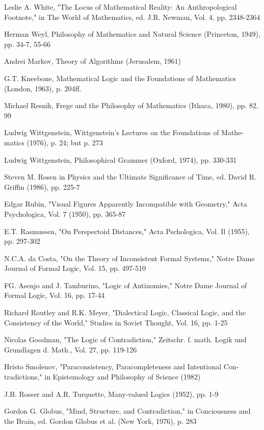 Leslie A. White, "The Locus of Mathematical Reality: An Anthropological 
Footnote," in The World of Mathematics, ed. J.R. Newman, Vol. 4, pp. 
2348-2364 

Herman Weyl, Philosophy of Mathematics and Natural Science (Princeton, 
1949), pp. 34-7, 55-66 

Andrei Markov, Theory of Algorithms (Jerusalem, 1961) 

G.T. Kneebone, Mathematical Logic and the Foundations of Mathematics 
(London, 1963), p. 204ff. 

Michael Resnik, Frege and the Philosophy of Mathematics (Ithaca, 1980), pp. 
82, 99 

Ludwig Wittgenstein, Wittgenstein's Lectures on the Foundations of Mathe- 
matics (1976), p. 24; but p. 273 

Ludwig Wittgenstein, Philosophical Grammer (Oxford, 1974), pp. 330-331 

Steven M. Rosen in Physics and the Ultimate Significance of Time, ed. David 
R. Griffin (1986), pp. 225-7 

Edgar Rubin, "Visual Figures Apparently Incompatible with Geometry," 
Acta Psychologica, Vol. 7 (1950), pp. 365-87 

E.T. Rasmussen, "On Perspectoid Distances," Acta Pschologica, Vol. Il 
(1955), pp. 297-302 

N.C.A. da Costa, "On the Theory of Inconsistent Formal Systems," Notre 
Dame Journal of Formal Logic, Vol. 15, pp. 497-510 

FG. Asenjo and J. Tamburino, "Logic of Antinomies," Notre Dame Journal 
of Formal Logic, Vol. 16, pp. 17-44 


Richard Routley and R.K. Meyer, "Dialectical Logic, Classical Logic, and the 
Consistency of the World," Studies in Soviet Thought, Vol. 16, pp. 1-25 

Nicolas Goodman, "The Logic of Contradiction," Zeitschr. f. math. Logik und 
Grundlagen d. Math., Vol. 27, pp. 119-126 

Hristo Smolenov, "Paraconsistency, Paracompleteness and Intentional Con- 
tradictions," in Epistemology and Philosophy of Science (1982) 

J.B. Rosser and A.R. Turquette, Many-valued Logics (1952), pp. 1-9 

Gordon G. Globus, "Mind, Structure, and Contradiction," in Conciousness 
and the Brain, ed. Gordon Globus et al. (New York, 1976), p. 283 


